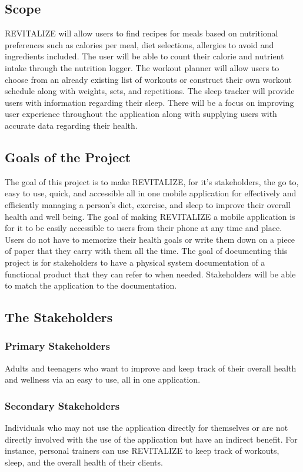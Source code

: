 \documentclass[12pt,letterpaper]{article}
\begin{document}
\subsection{Scope}
REVITALIZE will allow users to find recipes for meals based on nutritional preferences such as calories per meal, diet selections, allergies to avoid and ingredients included. The user will be able to count their calorie and nutrient intake through the nutrition logger. The workout planner will allow users to choose from an already existing list of workouts or construct their own workout schedule along with weights, sets, and repetitions. The sleep tracker will provide users with information regarding their sleep. There will be a focus on improving user experience throughout the application along with supplying users with accurate data regarding their health.

\subsection{Goals of the Project}
The goal of this project is to make REVITALIZE, for it's stakeholders, the go to, easy to use, quick, and accessible all in one mobile application for effectively and efficiently managing a person's diet, exercise, and sleep to improve their overall health and well being. The goal of making REVITALIZE a mobile application is for it to be easily accessible to users from their phone at any time and place. Users do not have to memorize their health goals or write them down on a piece of paper that they carry with them all the time. The goal of documenting this project is for stakeholders to have a physical system documentation of a functional product that they can refer to when needed. Stakeholders will be able to match the application to the documentation.

\subsection{The Stakeholders}

\subsubsection{Primary Stakeholders}
Adults and teenagers who want to improve and keep track of their overall health and wellness via an easy to use, all in one application.

\subsubsection{Secondary Stakeholders}
Individuals who may not use the application directly for themselves or are not directly involved with the use of the application but have an indirect benefit. For instance, personal trainers can use REVITALIZE to keep track of workouts, sleep, and the overall health of their clients.
\end{document}
